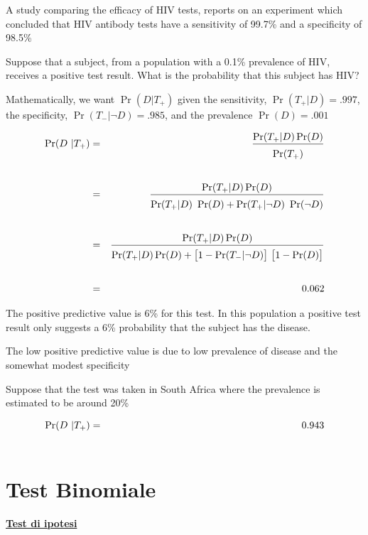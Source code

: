 \documentclass[11pt,openany]{book}
\begin{document}
A study comparing the efficacy of HIV tests, reports on an
experiment which concluded that HIV antibody tests have a
{\color{violet}sensitivity of 99.7\%} and a {\color{violet}specificity of 98.5\%}

Suppose that a subject, from a population with a {\color{violet} 0.1\% prevalence}
of HIV, receives a positive test result. What is the probability
that this subject has HIV?

Mathematically, we want $\Pr(D | T_+)$ given the sensitivity, {\color{violet}$\Pr(T_+
| D) = .997$}, the specificity, {\color{violet}$\Pr(T_- | \neg D) =.985$}, and the
prevalence {\color{violet}$\Pr(D) = .001$}

\begin{eqnarray*}
\Pr(D ~|T_+)& = &\frac{\Pr(T_+|D)\Pr(D)}{\Pr(T_+)\vphantom{\Big[}}\\ \\
& = &\frac{\Pr(T_+|D)\Pr(D)}{\Pr(T_+|D)\ \Pr(D) + \Pr(T_+|\neg D)\ \Pr(\neg D)\vphantom{\Big[}}\\ \\
& = & \frac{\Pr(T_+|D)\Pr(D)}{\Pr(T_+|D)\Pr(D) + \big[1-\Pr(T_-|\neg D)\big]\ \big[1 - \Pr(D)\big]\vphantom{\Big[}} \\ \\
& = & 0.062
\end{eqnarray*}

The {\color{violet}positive predictive value is 6\%} for this test. In this population a positive test result only suggests a 6\% probability that the subject has the disease. 


The low positive predictive value is due to low prevalence of disease and the
somewhat modest specificity 

Suppose that the test was taken in South Africa where the prevalence is estimated to be around 20\%

\begin{eqnarray*}
\Pr(D ~|T_+)& = & 0.943\\
& \hphantom{=} & \hphantom{\frac{\Pr(T_+|D)\Pr(D)}{\Pr(T_+|D)\Pr(D) + \big[1-\Pr(T_-|\neg D)\big]\ \big[1 - \Pr(D)\big]\vphantom{\Big[}}}
\end{eqnarray*}


\hfill{}\clearpage\section{Test Binomiale}
\hfill\textbf{{\color{brown}\hyperref[test_ipotesi]{Test di ipotesi \faShare}}}
\end{document}
